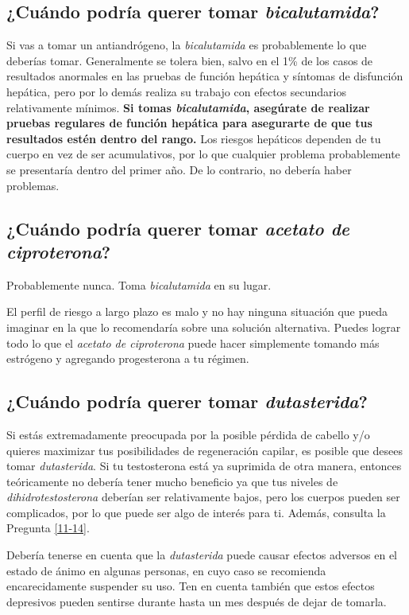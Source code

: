 \documentclass{article}
\begin{document}
\subsection{¿Cuándo podría querer tomar \textit{bicalutamida}?}

Si vas a tomar un antiandrógeno, la \textit{bicalutamida} es probablemente lo que deberías tomar. Generalmente se tolera bien, salvo en el 1\% de los casos de resultados anormales en las pruebas de función hepática y síntomas de disfunción hepática, pero por lo demás realiza su trabajo con efectos secundarios relativamente mínimos. \textbf{Si tomas \textit{bicalutamida}, asegúrate de realizar pruebas regulares de función hepática para asegurarte de que tus resultados estén dentro del rango.} Los riesgos hepáticos dependen de tu cuerpo en vez de ser acumulativos, por lo que cualquier problema probablemente se presentaría dentro del primer año. De lo contrario, no debería haber problemas.

\subsection{¿Cuándo podría querer tomar \textit{acetato de ciproterona}?}

Probablemente nunca. Toma \textit{bicalutamida} en su lugar.

El perfil de riesgo a largo plazo es malo y no hay ninguna situación que pueda imaginar en la que lo recomendaría sobre una solución alternativa. Puedes lograr todo lo que el \textit{acetato de ciproterona} puede hacer simplemente tomando más estrógeno y agregando progesterona a tu régimen.

\subsection{¿Cuándo podría querer tomar \textit{dutasterida}?}

Si estás extremadamente preocupada por la posible pérdida de cabello y/o quieres maximizar tus posibilidades de regeneración capilar, es posible que desees tomar \textit{dutasterida}. Si tu testosterona está ya suprimida de otra manera, entonces teóricamente no debería tener mucho beneficio ya que tus niveles de \textit{dihidrotestosterona} deberían ser relativamente bajos, pero los cuerpos pueden ser complicados, por lo que puede ser algo de interés para ti. Además, consulta la Pregunta \ref{11-14}.

Debería tenerse en cuenta que la \textit{dutasterida} puede causar efectos adversos en el estado de ánimo en algunas personas, en cuyo caso se recomienda encarecidamente suspender su uso. Ten en cuenta también que estos efectos depresivos pueden sentirse durante hasta un mes después de dejar de tomarla.
\end{document}
